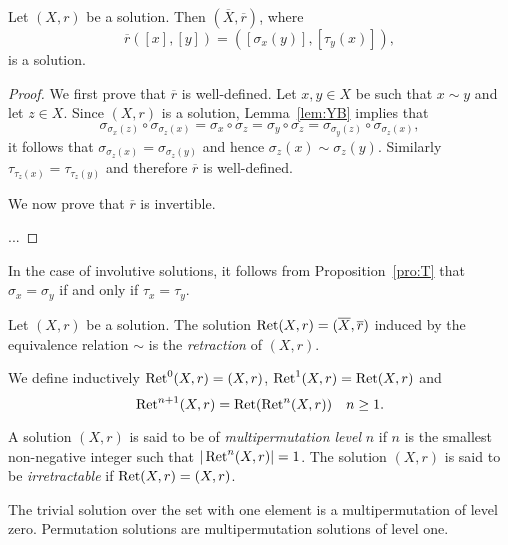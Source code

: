 \begin{proposition}
Let $(X,r)$ be a solution. Then $(\overline{X},\overline{r})$, where 
\[
\overline{r}([x],[y])=([\sigma_x(y)],[\tau_y(x)]),
\]
is a solution. 
\end{proposition}

\begin{proof}
    We first prove that $\overline{r}$ is well-defined. 
    Let $x,y\in X$ be such that $x\sim y$ and let $z\in X$. Since $(X,r)$ is a solution, 
    Lemma~\ref{lem:YB} implies that 
    \[
    \sigma_{\sigma_x(z)}\circ\sigma_{\sigma_z(x)}=\sigma_x\circ\sigma_z=\sigma_y\circ\sigma_z=\sigma_{\sigma_y(z)}\circ\sigma_{\sigma_z(x)},
    \]
    it follows that $\sigma_{\sigma_z(x)}=\sigma_{\sigma_z(y)}$ and hence $\sigma_z(x)\sim\sigma_z(y)$. 
    Similarly $\tau_{\tau_z(x)}=\tau_{\tau_z(y)}$ and therefore 
    $\overline{r}$ is well-defined. 
    
    We now prove that $\overline{r}$ is invertible. 
    
    ...
\end{proof}

In the case of involutive solutions, it follows from Proposition~\ref{pro:T} 
that $\sigma_x=\sigma_y$ if and only if $\tau_x=\tau_y$. 

\begin{definition}
Let $(X,r)$ be a solution. The solution $\operatorname{Ret}(X,r)=(\overline{X},\overline{r})$ induced
by the equivalence relation $\sim$ is the \emph{retraction} of $(X,r)$.
\end{definition}

We define inductively $\operatorname{Ret}^0(X,r)=(X,r)$, $\operatorname{Ret}^1(X,r)=\operatorname{Ret}(X,r)$ and
\[
\operatorname{Ret}^{n+1}(X,r)=\operatorname{Ret}(\operatorname{Ret}^n(X,r))\quad n\geq1.
\]


\begin{definition}
    A solution $(X,r)$ is said to be of \emph{multipermutation level} $n$ 
    if $n$ is the smallest non-negative integer 
    such that $|\operatorname{Ret}^n(X,r)|=1$. The solution $(X,r)$ is said to be 
    \emph{irretractable} if $\operatorname{Ret}(X,r)=(X,r)$. 
\end{definition}

The trivial solution over the set with one element is a multipermutation of level zero. 
Permutation solutions are multipermutation solutions of level one. 

\begin{example}

\end{example}

